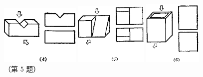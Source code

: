 \begin{xiaotis}
\begin{figure}[H]
    \centering
    \begin{minipage}[b]{4cm}
        \centering
        \includegraphics[width=3.8cm]{../pic/czjh2-ch8-xiti29-05-4.png}
    \end{minipage}
    \qquad
    \begin{minipage}[b]{4cm}
        \centering
        \includegraphics[width=3.5cm]{../pic/czjh2-ch8-xiti29-05-5.png}
    \end{minipage}
    \qquad
    \begin{minipage}[b]{4cm}
        \centering
        \includegraphics[width=2.8cm]{../pic/czjh2-ch8-xiti29-05-6.png}
    \end{minipage}
    \caption*{（第 5 题）}
\end{figure}

\end{xiaotis}

